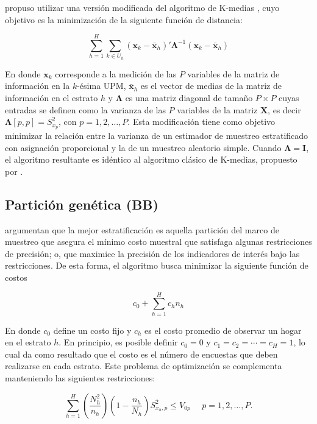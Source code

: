 \documentclass[
  12pt,
]{book}
\begin{document}
\citet{Jarque_1981} propuso utilizar una versión modificada del algoritmo de K-medias \citep{Macqueen_1967}, cuyo objetivo es la minimización de la siguiente función de distancia:

\[
\sum_{h=1}^H \sum_{k\in U_h}(\mathbf x_k - \bar {\mathbf x}_h)'\boldsymbol \Lambda^{-1}(\mathbf x_k - \bar {\mathbf x}_h)
\]

En donde \(\mathbf x_k\) corresponde a la medición de las \(P\) variables de la matriz de información en la \(k\)-ésima UPM, \(\bar {\mathbf x}_h\) es el vector de medias de la matriz de información en el estrato \(h\) y \(\boldsymbol \Lambda\) es una matriz diagonal de tamaño \(P \times P\) cuyas entradas se definen como la varianza de las \(P\) variables de la matriz \(\mathbf X\), es decir \(\boldsymbol \Lambda [p,p]=S^2_{x_p}\), con \(p = 1, 2, \ldots, P\). Esta modificación tiene como objetivo minimizar la relación entre la varianza de un estimador de muestreo estratificado con asignación proporcional y la de un muestreo aleatorio simple. Cuando \(\boldsymbol \Lambda = \mathbf I\), el algoritmo resultante es idéntico al algoritmo clásico de K-medias, propuesto por \citet{Macqueen_1967}.

\hypertarget{particiuxf3n-genuxe9tica-bb}{%
\subsection{Partición genética (BB)}\label{particiuxf3n-genuxe9tica-bb}}

\citet{Ballin_Barcaroli_2013} argumentan que la mejor estratificación es aquella partición del marco de muestreo que asegura el mínimo costo muestral que satisfaga algunas restricciones de precisión; o, que maximice la precisión de los indicadores de interés bajo las restricciones. De esta forma, el algoritmo busca minimizar la siguiente función de costos

\[
c_0 + \sum_{h=1}^{H} c_h n_h
\]

En donde \(c_0\) define un costo fijo y \(c_h\) es el costo promedio de observar un hogar en el estrato \(h\). En principio, es posible definir \(c_0=0\) y \(c_1 = c_2 = \cdots = c_H = 1\), lo cual da como resultado que el costo es el número de encuestas que deben realizarse en cada estrato. Este problema de optimización se complementa manteniendo las siguientes restricciones:

\[
\sum_{h=1}^{H} \left(\frac{N_h^2}{n_h}\right)\left(1-\frac{n_h}{N_h}\right) S^2_{x_h,p} \leq V_{0p}\ \ \  \ \ \ p = 1, 2, \ldots, P.
\]
\end{document}
